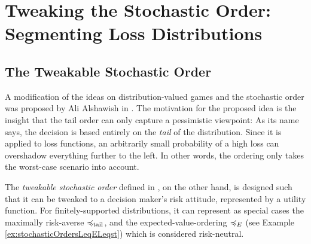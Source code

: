 \documentclass[a4paper]{scrreprt}
\theoremstyle{definition}
\begin{document}
    \chapter{Tweaking the Stochastic Order: Segmenting Loss Distributions}
    
    \section{The Tweakable Stochastic Order}
    A modification of the ideas on distribution-valued games and the stochastic order was proposed by Ali Alshawish in \cite{bib:tweakableStochasticOrders}.
    The motivation for the proposed idea is the insight that the tail order can only capture a pessimistic viewpoint: As its name says, the decision is based entirely on the \emph{tail} of the distribution. Since it is applied to loss functions, an arbitrarily small probability of a high loss can overshadow everything further to the left. In other words, the ordering only takes the worst-case scenario into account.
        
    The \emph{tweakable stochastic order} defined in \cite{bib:tweakableStochasticOrders}, on the other hand,
    is designed such that it can be tweaked to a decision maker's risk attitude, represented by a utility function.
    For finitely-supported distributions, it can represent as special cases the maximally risk-averse $\preccurlyeq_{\text{tail}}$, and the expected-value-ordering $\preccurlyeq_E$ (see Example \ref{ex:stochasticOrdersLeqELeqst}) which is considered risk-neutral.
    
\end{document}
